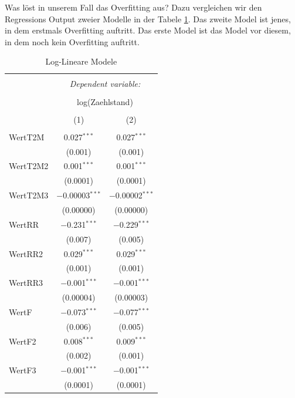 \documentclass[a4paper,12pt]{thesis}
\begin{document}
Was löst in unserem Fall das Overfitting aus? Dazu vergleichen wir den Regressions Output zweier Modelle in der Tabele \ref{ZweiModelle}. Das zweite Model ist jenes, in dem erstmals Overfitting auftritt. Das erste Model ist das Model vor diesem, in dem noch kein Overfitting auftritt.

	
	\begin{longtable}{@{\extracolsep{-5pt}}lcc} 
		\caption{Log-Lineare Modele} 
		\label{ZweiModelle}
		\\[-1.8ex]\hline 
		\hline \\[-1.8ex] 
		& \multicolumn{2}{c}{\textit{Dependent variable:}} \\ 
		\cline{2-3} 
		\\[-1.8ex] & \multicolumn{2}{c}{log(Zaehlstand)} \\ 
		\\[-1.8ex] & (1) & (2)\\ 
		\hline \\[-1.8ex] 
		WertT2M & 0.027$^{***}$ & 0.027$^{***}$ \\ 
		& (0.001) & (0.001) \\ 
		WertT2M2 & 0.001$^{***}$ & 0.001$^{***}$ \\ 
		& (0.0001) & (0.0001) \\ 
		WertT2M3 & $-$0.00003$^{***}$ & $-$0.00002$^{***}$ \\ 
		& (0.00000) & (0.00000) \\ 
		WertRR & $-$0.231$^{***}$ & $-$0.229$^{***}$ \\ 
		& (0.007) & (0.005) \\ 
		WertRR2 & 0.029$^{***}$ & 0.029$^{***}$ \\ 
		& (0.001) & (0.001) \\ 
		WertRR3 & $-$0.001$^{***}$ & $-$0.001$^{***}$ \\ 
		& (0.00004) & (0.00003) \\ 
		WertF & $-$0.073$^{***}$ & $-$0.077$^{***}$ \\ 
		& (0.006) & (0.005) \\ 
		WertF2 & 0.008$^{***}$ & 0.009$^{***}$ \\ 
		& (0.002) & (0.001) \\ 
		WertF3 & $-$0.001$^{***}$ & $-$0.001$^{***}$ \\ 
		& (0.0001) & (0.0001) \\ 

\end{longtable}
\end{document}
